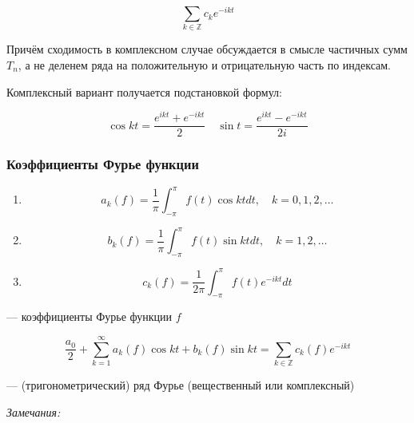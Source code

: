 \documentclass{article}
\begin{document}
\[\sum_{k \in \mathbb{Z}} c_k e^{-ikt}\]

Причём сходимость в комплексном случае обсуждается в смысле частичных сумм $T_n$, а не деленем ряда на положительную и отрицательную часть по индексам.

Комплексный вариант получается подстановкой формул:

\[\cos kt = \frac{e^{ikt} + e^{-ikt}}{2} \quad \sin t = \frac{e^{ikt} - e^{-ikt}}{2i}\]

\subsubsection{Коэффициенты Фурье функции}

\begin{enumerate}
    \item \[a_k(f) = \frac{1}{\pi} \int_{-\pi}^{\pi} f(t) \cos kt dt, \quad k = 0, 1, 2, \ldots\]
    \item \[b_k(f) = \frac{1}{\pi} \int_{-\pi}^{\pi} f(t) \sin kt dt, \quad k = 1, 2, \ldots\]
    \item \[c_k(f) = \frac{1}{2\pi} \int_{-\pi}^{\pi} f(t) e^{-ikt} dt\]
\end{enumerate}

--- коэффициенты Фурье функции $f$

\[\frac{a_0}{2} + \sum_{k = 1}^{\infty} a_k(f) \cos kt + b_k(f) \sin kt = \sum_{k \in \mathbb{Z}} c_k(f) e^{-ikt}\]

--- (тригонометрический) ряд Фурье (вещественный или комплексный)

\textit{Замечания:}
\end{document}
